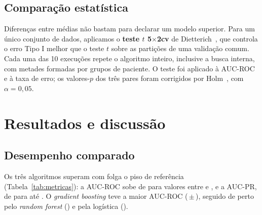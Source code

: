 \documentclass[conference,a4paper]{IEEEtran}
\begin{document}
\begin{table}[t]
\centering
\caption{Espaço de busca e hiperparâmetros mais escolhidos nas 10 partições externas (LR: regressão logística; RF: \textit{random forest}; GB: \textit{gradient boosting})}
\label{tab:hiper}
\footnotesize

\end{table}

\subsection{Comparação estatística}

Diferenças entre médias não bastam para declarar um modelo superior. Para um único conjunto de dados, aplicamos o \textbf{teste $t$ 5$\times$2cv} de Dietterich~\cite{dietterich1998}, que controla o erro Tipo I melhor que o teste $t$ sobre as partições de uma validação comum. Cada uma das 10 execuções repete o algoritmo inteiro, inclusive a busca interna, com metades formadas por grupos de paciente. O teste foi aplicado à AUC-ROC e à taxa de erro; os valores-$p$ dos três pares foram corrigidos por Holm~\cite{holm1979}, com $\alpha=0{,}05$.

\section{Resultados e discussão}

\begin{table}[t]
\centering
\caption{Desempenho na validação cruzada aninhada agrupada (média $\pm$ desvio-padrão nas 10 partições externas). Em negrito, o melhor valor entre os três algoritmos (inclusive empates na precisão exibida).}
\label{tab:metricas}
\scriptsize
\setlength{\tabcolsep}{3.2pt}

\end{table}

\subsection{Desempenho comparado}

Os três algoritmos superam com folga o piso de referência (Tabela~\ref{tab:metricas}): a AUC-ROC sobe de  para valores entre  e , e a AUC-PR, de  para até . O \textit{gradient boosting} teve a maior AUC-ROC (\,$\pm$\,), seguido de perto pelo \textit{random forest} () e pela logística ().
\end{document}
